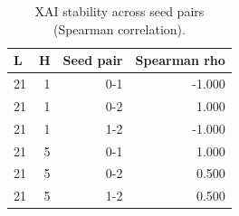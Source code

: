 \begin{table}[!htbp]
\centering
\caption{XAI stability across seed pairs (Spearman correlation).}
\label{tab:xai-stability}
\begin{tabular}{lrrr}
\toprule
L & H & Seed pair & Spearman rho \\
\midrule
21 & 1 & 0-1 & -1.000 \\
21 & 1 & 0-2 & 1.000 \\
21 & 1 & 1-2 & -1.000 \\
21 & 5 & 0-1 & 1.000 \\
21 & 5 & 0-2 & 0.500 \\
21 & 5 & 1-2 & 0.500 \\
\bottomrule
\end{tabular}
\end{table}
